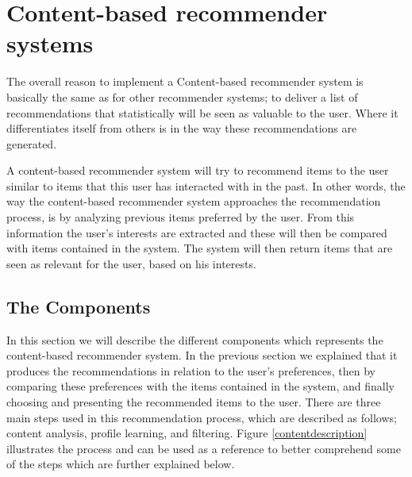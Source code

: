 \section{Content-based recommender systems}
\label{sec:content}
The overall reason to implement a Content-based recommender system is basically the same as for other recommender systems; to deliver a list of recommendations that statistically will be seen as valuable to the user. Where it differentiates itself from others is in the way these recommendations are generated.\newline 

A content-based recommender system will try to recommend items to the user similar to items that this user has interacted with in the past. In other words, the way the content-based recommender system approaches the recommendation process, is by analyzing previous items preferred by the user. From this information the user's interests are extracted and these will then be compared with items contained in the system.\newline
The system will then return items that are seen as relevant for the user, based on his interests. 

\subsection{The Components}
In this section we will describe the different components which represents the content-based recommender system. In the previous section we explained that it produces the recommendations in relation to the user's preferences, then by comparing these preferences with the items contained in the system, and finally choosing and presenting the recommended items to the user. \newline
There are three main steps used in this recommendation process, which are described as follows; content analysis, profile learning, and filtering. Figure \ref{contentdescription} illustrates the process and can be used as a reference to better comprehend some of the steps which are further explained below.

